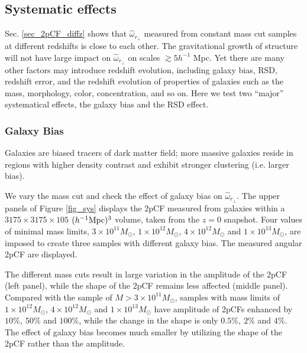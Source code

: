 \documentclass[iop]{emulateapj}
\begin{document}
\subsection{Systematic effects}


Sec. \ref{sec_2pCF_diffz} shows that $\hat \omega_{r_\perp}$ measured from 
constant mass cut samples at different redshifts is close to each other.
The gravitational growth of structure will not have large impact on $\hat \omega_{r_\perp}$ on scales $\gtrsim5 h^{-1}$ Mpc.
Yet there are many other factors may introduce redshift evolution,
including galaxy bias, RSD, redshift error, and 
the redshift evolution of properties of galaxies 
such as the mass, morphology, color, concentration, and so on. 
Here we test two ``major'' systematical effects, the galaxy bias and the RSD effect.



\subsubsection{Galaxy Bias}

Galaxies are biased tracers of dark matter field;
more massive galaxies reside in regions with higher density contrast
and exhibit stronger clustering (i.e. larger bias).

We vary the mass cut and check the effect of galaxy bias on $\hat \omega_{r_\perp}$.
The upper panels of Figure \ref{fig_sys} displays the 2pCF measured from galaxies within a $3175\times3175\times105$ $(h^{-1}\rm Mpc)^3$ volume, taken from the $z=0$ snapshot.
Four values of minimal mass limits, $3\times 10^{11} M_{\odot}$, $1\times 10^{12} M_{\odot}$, $4\times 10^{12} M_{\odot}$ and $1\times 10^{13} M_{\odot}$,
are imposed to create three samples with different galaxy bias.
The measured angular 2pCF are displayed.

The different mass cuts result in large variation in the amplitude of the 2pCF (left panel),
while the shape of the 2pCF remains less affected (middle panel).
Compared with the sample of $M>3\times 10^{11} M_{\odot}$,
samples with mass limits of $1\times 10^{12} M_{\odot}$, $4\times 10^{12} M_{\odot}$ and $1\times 10^{13} M_{\odot}$
have amplitude of 2pCFs enhanced by $10\%,\ 50\%$ and $100\%$,
while the change in the shape is only $0.5\%,\ 2\%$ and $4\%$.
The effect of galaxy bias becomes much smaller by utilizing the shape of the 2pCF rather than the amplitude.
\end{document}
